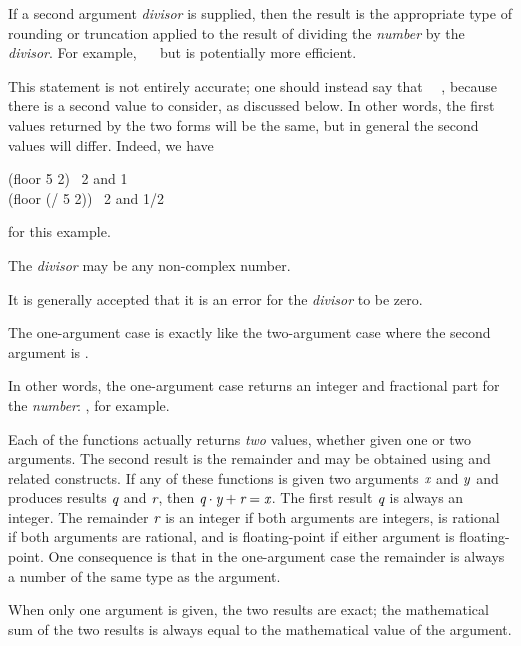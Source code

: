 \begin{defun}[Function]
If a second argument \emph{divisor} is supplied, then the result
is the appropriate type of rounding or truncation applied to the
result of dividing the \emph{number} by the \emph{divisor}.
For example, ~\EQ~ but is potentially more
efficient.
\begin{new}%
This statement is not entirely accurate; one should instead say that
~\EQ~,
because there is a second value to consider, as discussed below.
In other words, the first values returned by the two forms will be the same, but
in general the second values will differ.  Indeed, we have
\begin{lisp}
(floor 5 2) \EV\ 2 \textrm{and} 1 \\
(floor (/ 5 2)) \EV\ 2 \textrm{and} 1/2
\end{lisp}
for this example.
\end{new}
The \emph{divisor} may be any non-complex number.
\begin{new}%
It is generally accepted that it is an error for the \emph{divisor} to be zero.
\end{new}
The one-argument case is exactly like the two-argument case where the second
argument is .

\begin{newer}
In other words, the one-argument case returns an integer and fractional part
for the \emph{number}: , for example.
\end{newer}
Each of the functions actually returns \emph{two} values,
whether given one or two arguments.  The second
result is the remainder and may be obtained using
 and related constructs.
If any of these functions is given two arguments $\emph{x}$ and $\emph{y}$
and produces results $\emph{q}$ and $\emph{r}$, then $\emph{q} \cdot \emph{y}+\emph{r}=\emph{x}$.
The first result $\emph{q}$ is always an integer.
The remainder $\emph{r}$ is an integer if both arguments are integers,
is rational if both arguments are rational,
and is floating-point if either argument is floating-point.
One consequence is that
in the one-argument case the remainder is always a number of the same type
as the argument.

When only one argument is given, the two results are exact;
the mathematical sum of the two results is always equal to the
mathematical value of the argument.
\end{defun}

